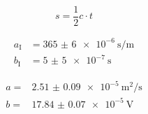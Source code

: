 \begin{equation}
    s = \frac{1}{2} c \cdot t
    \label{eq:strecke}
\end{equation}

\begin{align}
    a_\text{I} &= \SI{365(6)e-6}{\second\per\meter}\\
    b_\text{I} &= \SI{5(5)e-7}{\second}
\end{align}

\begin{align*}
    a =& \SI{2.51(9)e-5}{\meter\squared\per\second} \\
    b =& \SI{17.84(7)e-5}{\volt}
\end{align*}

